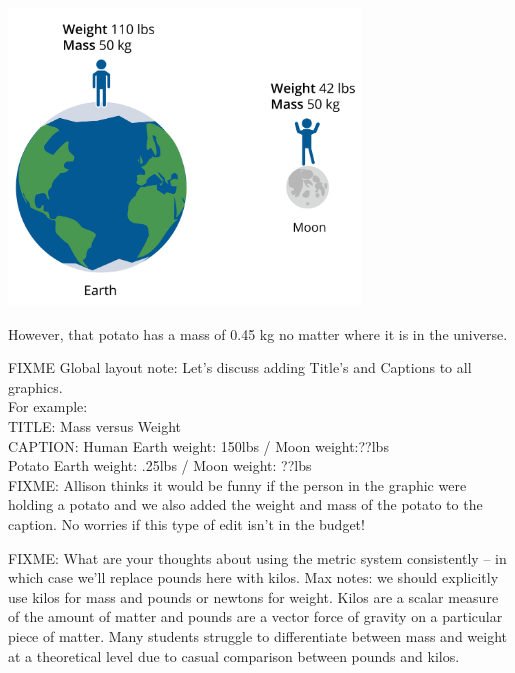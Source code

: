 \includegraphics[width=0.7\textwidth]{massvweight.png}

However, that potato has a mass of 0.45 kg no matter where it is in the universe.

FIXME Global layout note: Let's discuss adding Title's and Captions to all graphics.\\

For example:\\
TITLE: Mass versus Weight\\
CAPTION: Human Earth weight: 150lbs / Moon weight:??lbs\\
Potato Earth weight: .25lbs / Moon weight: ??lbs \\

FIXME:
Allison thinks it would be funny if the person in the graphic were holding a potato and we also added the weight and mass of the potato to the caption. No worries if this type of edit isn't in the budget!

FIXME: What are your thoughts about using the metric system consistently -- in which case we'll replace pounds here with kilos. Max notes: we should explicitly use kilos for mass and pounds or newtons for weight. Kilos are a scalar measure of the amount of matter and pounds are a vector force of gravity on a particular piece of matter. Many students struggle to differentiate between mass and weight at a theoretical level due to casual comparison between pounds and kilos.
